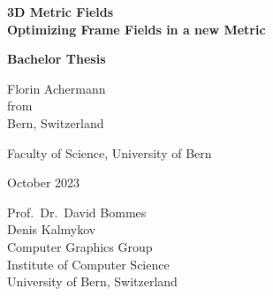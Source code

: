 \documentclass[a4paper,twoside,openright,11pt]{report}
\newcommand{\thesistitle}{3D Metric Fields}
\newcommand{\thesisauthor}{Florin Achermann}
\newcommand{\thesisauthororigin}{Bern, Switzerland}
\newcommand{\thesisleiter}{Prof.\ Dr.\ David Bommes}
\newcommand{\thesisasst}{Denis Kalmykov}
\newcommand{\thesissubtitle}{Optimizing Frame Fields in a new Metric}
\newcommand{\thesisdate}{October 2023}
\begin{document}

\begin{titlepage}  
  \thispagestyle{empty}

  \begin{center}  
    \begin{figure}[t]  
      \vspace{1in}     
    \end{figure}
    
    {\bfseries\Huge \thesistitle \\[2mm]
      \Large \thesissubtitle}\\
    \vspace{1.5cm}

    {\bfseries\LARGE Bachelor Thesis}\\
    \vspace{1.5cm}
    
    {\Large \thesisauthor\\[2mm]
      from\\[2mm]
      \thesisauthororigin}\\
    \vspace{1.5cm}

    {\Large Faculty of Science, University of Bern}\\
    \vspace{1.5cm}

    {\Large \thesisdate}\\
    \vspace{1.5cm}

    \vspace*{\fill}
    {\Large
      \thesisleiter\\
      \thesisasst\\
      Computer Graphics Group\\
      Institute of Computer Science\\
      University of Bern, Switzerland\\}
  \end{center}
\end{titlepage}
\end{document}
